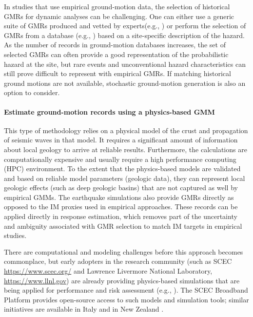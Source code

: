 In studies that use empirical ground-motion data, the selection of historical GMRs for dynamic analyses can be challenging. One can either use a generic suite of GMRs produced and vetted by experts(e.g., \cite{baker2011new}) or perform the selection of GMRs from a database (e.g., \cite{ancheta2014ngawest2}) based on a site-specific description of the hazard. As the number of records in ground-motion databases increases, the set of selected GMRs can often provide a good representation of the probabilistic hazard at the site, but rare events and unconventional hazard characteristics can still prove difficult to represent with empirical GMRs. If matching historical ground motions are not available, stochastic ground-motion generation is also an option to consider.

\paragraph{Estimate ground-motion records using a physics-based GMM} This type of methodology relies on a physical model of the crust and propagation of seismic waves in that model. It requires a significant amount of information about local geology to arrive at reliable results. Furthermore, the calculations are computationally expensive and usually require a high performance computing (HPC) environment. To the extent that the physics-based models are validated and based on reliable model parameters (geologic data), they can represent local geologic effects (such as deep geologic basins) that are not captured as well by empirical GMMs. The earthquake simulations also provide GMRs directly as opposed to the IM proxies used in empirical approaches. These records can be applied directly in response estimation, which removes part of the uncertainty and ambiguity associated with GMR selection to match IM targets in empirical studies. 

There are computational and modeling challenges before this approach becomes commonplace, but early adopters in the research community (such as SCEC  \url{https://www.scec.org/} and Lawrence Livermore National Laboratory, \url{https://www.llnl.gov}) are already providing physics-based simulations that are being applied for performance and risk assessment (e.g., \cite{frankel2018broadband, rodgers2019effect}). The SCEC Broadband Platform \citep{maechling2015scec} provides open-source access to such models and simulation tools; similar initiatives are available in Italy \citep{damico2017synthesis} and in New Zealand \citep{bradley2017guidance}. 

